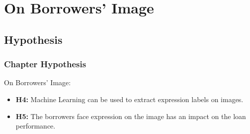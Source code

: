 \documentclass{beamer}
\begin{document}
% 

\section{On Borrowers' Image} 
\subsection{Hypothesis}
\begin{frame}\frametitle{Chapter Hypothesis}
\begin{block}{On Borrowers' Image:}
\begin{itemize}
\item \textbf{H4:} Machine Learning can be used to extract expression labels on images.
\item \textbf{H5:} The borrowers face expression on the image has an impact on the loan performance.
\end{itemize}
\end{block}
\end{frame}
\end{document}

